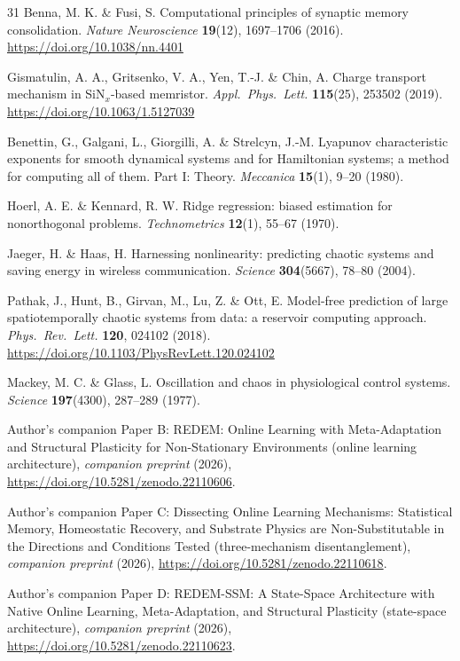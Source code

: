 \documentclass[11pt]{article}
\begin{document}
\begin{thebibliography}{31}
 Benna, M. K. \& Fusi, S. Computational principles of
synaptic memory consolidation. \emph{Nature Neuroscience} \textbf{19}(12),
1697--1706 (2016). \url{https://doi.org/10.1038/nn.4401}

 Gismatulin, A. A., Gritsenko, V. A., Yen, T.-J. \&
Chin, A. Charge transport mechanism in SiN$_x$-based memristor.
\emph{Appl.\ Phys.\ Lett.} \textbf{115}(25), 253502 (2019).
\url{https://doi.org/10.1063/1.5127039}

 Benettin, G., Galgani, L., Giorgilli, A. \& Strelcyn,
J.-M. Lyapunov characteristic exponents for smooth dynamical systems and for
Hamiltonian systems; a method for computing all of them. Part I: Theory.
\emph{Meccanica} \textbf{15}(1), 9--20 (1980).

 Hoerl, A. E. \& Kennard, R. W. Ridge regression: biased
estimation for nonorthogonal problems. \emph{Technometrics} \textbf{12}(1),
55--67 (1970).

 Jaeger, H. \& Haas, H. Harnessing nonlinearity: predicting
chaotic systems and saving energy in wireless communication. \emph{Science}
\textbf{304}(5667), 78--80 (2004).

 Pathak, J., Hunt, B., Girvan, M., Lu, Z. \& Ott, E.
Model-free prediction of large spatiotemporally chaotic systems from data: a
reservoir computing approach. \emph{Phys.\ Rev.\ Lett.} \textbf{120}, 024102
(2018). \url{https://doi.org/10.1103/PhysRevLett.120.024102}

 Mackey, M. C. \& Glass, L. Oscillation and chaos in
physiological control systems. \emph{Science} \textbf{197}(4300), 287--289
(1977).

 Author's companion Paper B: REDEM: Online Learning
with Meta-Adaptation and Structural Plasticity for Non-Stationary
Environments (online learning architecture),
\emph{companion preprint} (2026),
\url{https://doi.org/10.5281/zenodo.22110606}.

 Author's companion Paper C: Dissecting Online
Learning Mechanisms: Statistical Memory, Homeostatic Recovery, and
Substrate Physics are Non-Substitutable in the Directions and
Conditions Tested (three-mechanism disentanglement), \emph{companion
preprint} (2026),
\url{https://doi.org/10.5281/zenodo.22110618}.

 Author's companion Paper D: REDEM-SSM: A State-Space
Architecture with Native Online Learning, Meta-Adaptation, and Structural
Plasticity (state-space architecture),
\emph{companion preprint} (2026),
\url{https://doi.org/10.5281/zenodo.22110623}.

\end{thebibliography}
\end{document}
